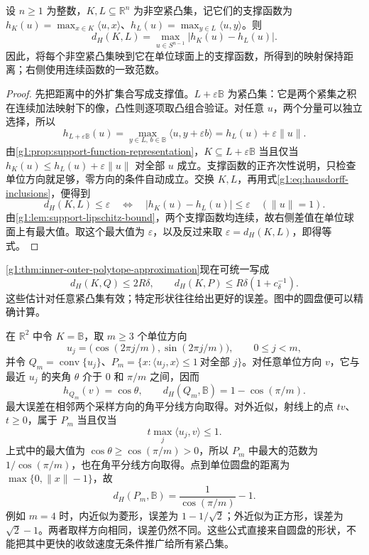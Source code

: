 \begin{theorem}\label{g1:thm:hausdorff-support-isometry}
	设 \(n\ge1\) 为整数，\(K,L\subseteq\mathbb R^n\) 为非空紧凸集，记它们的支撑函数为 \(h_K(u)=\max_{x\in K}\langle u,x\rangle\)、\(h_L(u)=\max_{y\in L}\langle u,y\rangle\)。则
	\begin{equation}\label{g1:eq:hausdorff-support-isometry}
		d_H(K,L)=\max_{u\in S^{n-1}}|h_K(u)-h_L(u)|.
	\end{equation}
	因此，将每个非空紧凸集映到它在单位球面上的支撑函数，所得到的映射保持距离；右侧使用连续函数的一致范数。
\end{theorem}
\begin{proof}
	先把距离中的外扩集合写成支撑值。\(L+\varepsilon\mathbb B\) 为紧凸集：它是两个紧集之积在连续加法映射下的像，凸性则逐项取凸组合验证。对任意 \(u\)，两个分量可以独立选择，所以
	\[
		h_{L+\varepsilon\mathbb B}(u)
		=\max_{y\in L,\,b\in\mathbb B}\langle u,y+\varepsilon b\rangle
		=h_L(u)+\varepsilon\lVert u\rVert.
	\]
	由\cref{g1:prop:support-function-representation}，\(K\subseteq L+\varepsilon\mathbb B\) 当且仅当 \(h_K(u)\le h_L(u)+\varepsilon\lVert u\rVert\) 对全部 \(u\) 成立。支撑函数的正齐次性说明，只检查单位方向就足够，零方向的条件自动成立。交换 \(K,L\)，再用式\eqref{g1:eq:hausdorff-inclusions}，便得到
	\[
		d_H(K,L)\le\varepsilon
		\quad\Longleftrightarrow\quad
		|h_K(u)-h_L(u)|\le\varepsilon\quad(\lVert u\rVert=1).
	\]
	由\cref{g1:lem:support-lipschitz-bound}，两个支撑函数均连续，故右侧差值在单位球面上有最大值。取这个最大值为 \(\varepsilon\)，以及反过来取 \(\varepsilon=d_H(K,L)\)，即得等式。
\end{proof}

\cref{g1:thm:inner-outer-polytope-approximation}现在可统一写成
\[
	d_H(K,Q)\le2R\delta,\qquad
	d_H(K,P)\le R\delta(1+c_\delta^{-1}).
\]
这些估计对任意紧凸集有效；特定形状往往给出更好的误差。图中的圆盘便可以精确计算。

\begin{example}\label{g1:exm:regular-polygon-support-error}
	在 \(\mathbb R^2\) 中令 \(K=\mathbb B\)，取 \(m\ge3\) 个单位方向
	\[
		u_j=\bigl(\cos(2\pi j/m),\sin(2\pi j/m)\bigr),\qquad 0\le j<m,
	\]
	并令 \(Q_m=\operatorname{conv}\{u_j\}\)、\(P_m=\{x:\langle u_j,x\rangle\le1\ \text{对全部 }j\}\)。对任意单位方向 \(v\)，它与最近 \(u_j\) 的夹角 \(\theta\) 介于 \(0\) 和 \(\pi/m\) 之间，因而
	\[
		h_{Q_m}(v)=\cos\theta,\qquad
		d_H(Q_m,\mathbb B)=1-\cos(\pi/m).
	\]
	最大误差在相邻两个采样方向的角平分线方向取得。对外近似，射线上的点 \(tv\)、\(t\ge0\)，属于 \(P_m\) 当且仅当
	\[
		t\max_j\langle u_j,v\rangle\le1.
	\]
	上式中的最大值为 \(\cos\theta\ge\cos(\pi/m)>0\)，所以 \(P_m\) 中最大的范数为 \(1/\cos(\pi/m)\)，也在角平分线方向取得。点到单位圆盘的距离为 \(\max\{0,\lVert x\rVert-1\}\)，故
	\[
		d_H(P_m,\mathbb B)=\frac1{\cos(\pi/m)}-1.
	\]
	例如 \(m=4\) 时，内近似为菱形，误差为 \(1-1/\sqrt2\)；外近似为正方形，误差为 \(\sqrt2-1\)。两者取样方向相同，误差仍然不同。这些公式直接来自圆盘的形状，不能把其中更快的收敛速度无条件推广给所有紧凸集。
\end{example}

